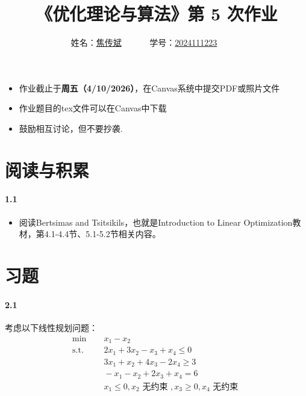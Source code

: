 \documentclass[12pt,a4paper]{article}
\begin{document}
\title{
{《优化理论与算法》第 5 次作业
}
}
\date{}

\author{
姓名：\underline{焦传斌}~~~~~~
学号：\underline{2024111223}~~~~~~}

\maketitle

\begin{itemize}
	\item 作业截止于{\bf 周五（4/10/2026）}，在Canvas系统中提交PDF或照片文件
	\item 作业题目的tex文件可以在Canvas中下载
	\item 鼓励相互讨论，但不要抄袭.
\end{itemize}

\section{阅读与积累}
\paragraph{1.1}
\begin{itemize}
	\item 阅读Bertsimas and Tsitsikils，也就是Introduction to Linear Optimization教材，第4.1-4.4节、5.1-5.2节相关内容。
\end{itemize}

\section{习题}

\paragraph{2.1}
考虑以下线性规划问题：
\begin{align*}
\min \;&\quad x_1 - x_2 \\
\text{s.t.} \;&\quad2x_1 + 3x_2 - x_3 + x_4 \leq 0 \\
 \;&\quad3x_1 + x_2 + 4x_3 - 2x_4 \geq 3 \\
 \;&\quad-x_1 - x_2 + 2x_3 + x_4 = 6 \\
 \;&\quad x_1 \leq 0, x_2 \text{ 无约束 }, x_3 \geq 0, x_4 \text{ 无约束 }
\end{align*}
\end{document}

